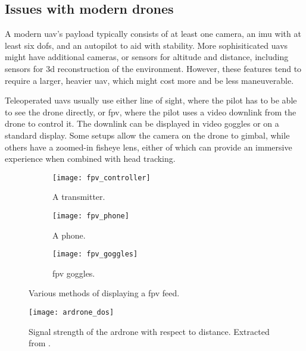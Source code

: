 \subsection{Issues with modern drones}
A modern \gls{uav}'s payload typically consists of at least one camera, an \gls{imu} with at least six \glspl{dof}, and an autopilot to aid with stability.
More sophisiticated \glspl{uav} might have additional cameras, or sensors for altitude and distance, including sensors for \gls{3d} reconstruction of the environment.
However, these features tend to require a larger, heavier \gls{uav}, which might cost more and be less maneuverable.

Teleoperated \glspl{uav} usually use either line of sight, where the pilot has to be able to see the drone directly, or \gls{fpv}, where the pilot uses a video downlink from the drone to control it.
The downlink can be displayed in video goggles or on a standard display.
Some setups allow the camera on the drone to gimbal, while others have a zoomed-in fisheye lens, either of which can provide an immersive experience when combined with head tracking.

\begin{figure}[h]
  \centering
  \begin{subfigure}[b]{0.3\textwidth}
    \texttt{[image: fpv\_controller]}
    \caption{A transmitter.\cite{fpv_controller}}
    \label{fig:fpv_controller}
  \end{subfigure}
  \hfill
  \begin{subfigure}[b]{0.3\textwidth}
    \texttt{[image: fpv\_phone]}
    \caption{A phone.\cite{fpv_phone}}
    \label{fig:fpv_phone}
  \end{subfigure}
  \hfill
  \begin{subfigure}[b]{0.3\textwidth}
    \texttt{[image: fpv\_goggles]}
    \caption{\gls{fpv} goggles.\cite{fpv_goggles}}
    \label{fig:fpv_goggles}
  \end{subfigure}
  \caption[\acrshort{fpv} display methods]{Various methods of displaying a \gls{fpv} feed.}
  \label{fig:fpv_various}
\end{figure}

\begin{wrapfigure}{r}{0.5\textwidth}
  \centering
  \texttt{[image: ardrone\_dos]}
  \caption[AR.Drone signal profile]{Signal strength of the \gls{ardrone} with respect to distance. Extracted from \cite{ardrone_dos}.}
  \label{fig:ardrone_dos}
\end{wrapfigure}

